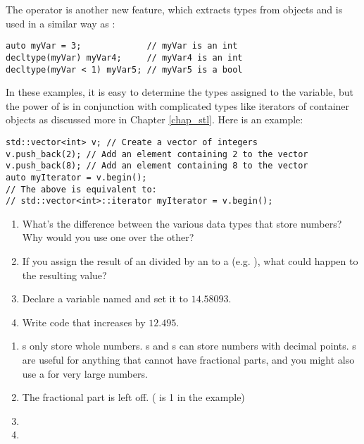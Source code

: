 The  operator is another new feature, which extracts types from objects and is used in a similar way as :

\noindent\begin{minipage}{\linewidth}\begin{lstlisting}
auto myVar = 3;             // myVar is an int
decltype(myVar) myVar4;     // myVar4 is an int
decltype(myVar < 1) myVar5; // myVar5 is a bool
\end{lstlisting}\end{minipage}

In these examples, it is easy to determine the types assigned to the variable, but the power of  is in conjunction with complicated types like iterators of container objects as discussed more in Chapter \ref{chap_stl}. Here is an example:

\noindent\begin{minipage}{\linewidth}\begin{lstlisting}
std::vector<int> v; // Create a vector of integers
v.push_back(2); // Add an element containing 2 to the vector
v.push_back(8); // Add an element containing 8 to the vector
auto myIterator = v.begin();
// The above is equivalent to:
// std::vector<int>::iterator myIterator = v.begin();
\end{lstlisting}\end{minipage}


\begin{enumerate}
	\item What's the difference between the various data types that store numbers? Why would you use one over the other?

	\item If you assign the result of an  divided by an  to a  (e.g. ), what could happen to the resulting value?

  \item Declare a variable named  and set it to $14.58093$.

 	\item Write code that increases  by $12.495$. 

\end{enumerate}



\begin{enumerate}
	\item {}s only store whole numbers. 
				s and s can store numbers with decimal points. 
				s are useful for anything that cannot have fractional parts, and you might also use a  for very large numbers.
	\item The fractional part is left off. ( is 1 in the example)
	\item {}
	\item {}

\end{enumerate}

